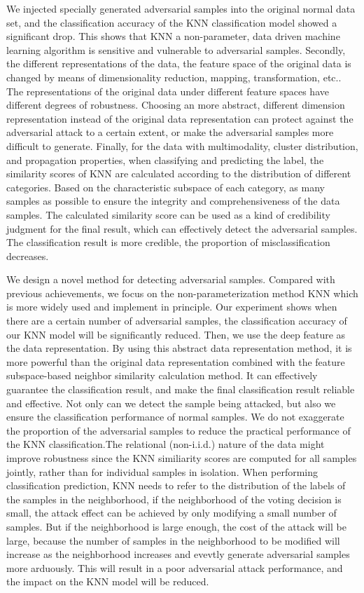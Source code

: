 \documentclass{ieeeaccess}
\begin{document}
We injected specially generated adversarial samples into the original normal data set, and the classification accuracy of the KNN classification model showed a significant drop. This shows that KNN a non-parameter, data driven machine learning algorithm is sensitive and vulnerable to adversarial samples. Secondly, the different representations of the data, the feature space of the original data is changed by means of dimensionality reduction, mapping, transformation, etc.. The representations of the original data under different feature spaces have different degrees of robustness. Choosing an more abstract, different dimension representation instead of the original data representation can protect against the adversarial attack to a certain extent, or make the adversarial samples more difficult to generate. Finally, for the data with multimodality, cluster distribution, and propagation properties, when classifying and predicting the label, the similarity scores of KNN are calculated according to the distribution of different categories. Based on  the characteristic subspace of each category, as many samples as possible to ensure the integrity and comprehensiveness of the data samples. The calculated similarity score can be used as a kind of credibility judgment for the final result, which can effectively detect the adversarial samples. The classification result is more credible, the proportion of misclassification decreases.

We design a novel method for detecting adversarial samples. Compared with previous achievements, we focus on the non-parameterization method KNN which is more widely used and implement in principle. Our experiment shows when there are a certain number of adversarial samples, the classification accuracy of our KNN model will be significantly reduced. Then, we use the deep feature as the data representation. By using this abstract data representation method, it is more powerful than the original data representation combined with the feature subspace-based neighbor similarity calculation method. It can effectively guarantee the classification result, and make the final classification result reliable and effective. Not only can we detect the sample being attacked, but also we ensure the classification performance of normal samples. We do not exaggerate the proportion of the adversarial samples to reduce the practical performance of the KNN classification.The relational (non-i.i.d.) nature of the data might improve robustness since the KNN similiarity scores are computed for all samples jointly, rather than for individual samples in isolation. When performing classification prediction, KNN needs to refer to the distribution of the labels of the samples in the neighborhood, if the neighborhood of the voting decision is small, the attack effect can be achieved by only modifying a small number of samples. But if the neighborhood is large enough, the cost of the attack will be large, because the number of samples in the neighborhood to be modified will increase as the neighborhood increases and evevtly generate adversarial samples more arduously. This will result in a poor adversarial attack performance, and the impact on the KNN model will be reduced.
\end{document}
